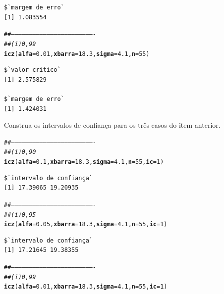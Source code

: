 \documentclass[a4paper,11pt,fleqn]{article}\usepackage[]{graphicx}\usepackage[]{color}
\makeatletter
\newcommand{\hlnum}[1]{\textcolor[rgb]{0,0,0}{#1}}%
\newcommand{\hlcom}[1]{\textcolor[rgb]{0.4,0.4,0.4}{\textit{#1}}}%
\newcommand{\hlstd}[1]{\textcolor[rgb]{0,0,0}{#1}}%
\newcommand{\hlkwc}[1]{\textcolor[rgb]{0,0,0}{\textbf{#1}}}%
\newcommand{\hlkwd}[1]{\textcolor[rgb]{0,0,0}{\textbf{#1}}}%
\newenvironment{kframe}{%
 \def\at@end@of@kframe{}%
 \ifinner\ifhmode%
  \def\at@end@of@kframe{\end{minipage}}%
  \begin{minipage}{\columnwidth}%
 \fi\fi%
 \def\FrameCommand##1{\hskip\@totalleftmargin \hskip-\fboxsep
 \colorbox{shadecolor}{##1}\hskip-\fboxsep
     \hskip-\linewidth \hskip-\@totalleftmargin \hskip\columnwidth}%
 \MakeFramed {\advance\hsize-\width
   \@totalleftmargin\z@ \linewidth\hsize
   \@setminipage}}%
 {\par\unskip\endMakeFramed%
 \at@end@of@kframe}
\newenvironment{knitrout}{}{} %
\theoremstyle{definition}
\makeatother
\begin{document}
\begin{compactenum}[4.]
\begin{compactenum}
\begin{knitrout}
\begin{kframe}
\begin{verbatim}
$`margem de erro`
[1] 1.083554
\end{verbatim}
\begin{alltt}
\hlcom{##----------------------------------------------------------------------}
\hlcom{## (i) 0,99}
\hlkwd{icz}\hlstd{(}\hlkwc{alfa} \hlstd{=} \hlnum{0.01}\hlstd{,} \hlkwc{xbarra} \hlstd{=} \hlnum{18.3}\hlstd{,} \hlkwc{sigma} \hlstd{=} \hlnum{4.1}\hlstd{,} \hlkwc{n} \hlstd{=} \hlnum{55}\hlstd{)}
\end{alltt}
\begin{verbatim}
$`valor critico`
[1] 2.575829

$`margem de erro`
[1] 1.424031
\end{verbatim}
\end{kframe}
\end{knitrout}
  \item Construa os intervalos de confiança para os três casos do item
    anterior.
\begin{knitrout}\small
{}\color{fgcolor}\begin{kframe}
\begin{alltt}
\hlcom{##----------------------------------------------------------------------}
\hlcom{## (i) 0,90}
\hlkwd{icz}\hlstd{(}\hlkwc{alfa} \hlstd{=} \hlnum{0.1}\hlstd{,} \hlkwc{xbarra} \hlstd{=} \hlnum{18.3}\hlstd{,} \hlkwc{sigma} \hlstd{=} \hlnum{4.1}\hlstd{,} \hlkwc{n} \hlstd{=} \hlnum{55}\hlstd{,} \hlkwc{ic} \hlstd{=} \hlnum{1}\hlstd{)}
\end{alltt}
\begin{verbatim}
$`intervalo de confiança`
[1] 17.39065 19.20935
\end{verbatim}
\begin{alltt}
\hlcom{##----------------------------------------------------------------------}
\hlcom{## (i) 0,95}
\hlkwd{icz}\hlstd{(}\hlkwc{alfa} \hlstd{=} \hlnum{0.05}\hlstd{,} \hlkwc{xbarra} \hlstd{=} \hlnum{18.3}\hlstd{,} \hlkwc{sigma} \hlstd{=} \hlnum{4.1}\hlstd{,} \hlkwc{n} \hlstd{=} \hlnum{55}\hlstd{,} \hlkwc{ic} \hlstd{=} \hlnum{1}\hlstd{)}
\end{alltt}
\begin{verbatim}
$`intervalo de confiança`
[1] 17.21645 19.38355
\end{verbatim}
\begin{alltt}
\hlcom{##----------------------------------------------------------------------}
\hlcom{## (i) 0,99}
\hlkwd{icz}\hlstd{(}\hlkwc{alfa} \hlstd{=} \hlnum{0.01}\hlstd{,} \hlkwc{xbarra} \hlstd{=} \hlnum{18.3}\hlstd{,} \hlkwc{sigma} \hlstd{=} \hlnum{4.1}\hlstd{,} \hlkwc{n} \hlstd{=} \hlnum{55}\hlstd{,} \hlkwc{ic} \hlstd{=} \hlnum{1}\hlstd{)}

\end{alltt}
\end{kframe}
\end{knitrout}
\end{compactenum}
\end{compactenum}
\end{document}
